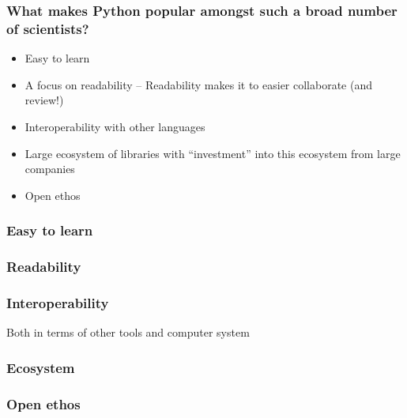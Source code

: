 \documentclass[
    xcolor={svgnames,dvipsnames},
    hyperref={colorlinks, citecolor=DeepPink4, linkcolor=DarkRed, urlcolor=DarkBlue}
]{beamer}  %
\newcommand{\1}{\mathbbm 1}
\begin{document}
\begin{frame}
    \frametitle{What makes Python popular amongst such a broad number of scientists?}

    \begin{itemize}
        \item Easy to learn
        \item A focus on readability -- Readability makes it to easier collaborate (and review!)
        \item Interoperability with other languages
        \item Large ecosystem of libraries with ``investment'' into this ecosystem from large companies
        \item Open ethos
    \end{itemize}

\end{frame}

\begin{frame}
    \frametitle{Easy to learn}

\end{frame}

\begin{frame}
    \frametitle{Readability}

\end{frame}

\begin{frame}
    \frametitle{Interoperability}

    Both in terms of other tools and computer system

\end{frame}

\begin{frame}
    \frametitle{Ecosystem}

\end{frame}

\begin{frame}
    \frametitle{Open ethos}

\end{frame}
\end{document}

